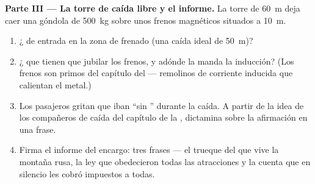 \begin{problem}
\medskip\noindent\textbf{Parte III --- La torre de caída libre y el
informe.}
La torre de \qty{60}{m} deja caer una góndola de \qty{500}{kg} sobre
unos frenos magnéticos situados a \qty{10}{m}.
\begin{enumerate}[resume]
  \item ¿ de entrada en la zona de frenado (una caída
        ideal de \qty{50}{m})?
  \item ¿ que tienen que jubilar los frenos, y adónde la
        manda la inducción? (Los frenos son primos del capítulo del
         --- remolinos de corriente inducida que
        calientan el metal.)
  \item Los pasajeros gritan que iban ``sin '' durante la caída.
        A partir de la idea de los compañeros de caída del capítulo
        de la , dictamina sobre la afirmación en una
        frase.
  \item Firma el informe del encargo: tres frases --- el trueque del
        que vive la montaña rusa, la ley que obedecieron todas las
        atracciones y la cuenta que en silencio les cobró impuestos a
        todas.
\end{enumerate}
\end{problem}
